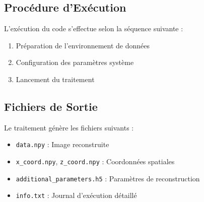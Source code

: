 \documentclass[12pt,a4paper]{article}
\begin{document}
\subsection{Procédure d'Exécution}
L'exécution du code s'effectue selon la séquence suivante :
\begin{enumerate}
    \item Préparation de l'environnement de données
    \item Configuration des paramètres système
    \item Lancement du traitement
\end{enumerate}

\subsection{Fichiers de Sortie}
Le traitement génère les fichiers suivants :
\begin{itemize}
    \item \texttt{data.npy} : Image reconstruite
    \item \texttt{x\_coord.npy}, \texttt{z\_coord.npy} : Coordonnées spatiales
    \item \texttt{additional\_parameters.h5} : Paramètres de reconstruction
    \item \texttt{info.txt} : Journal d'exécution détaillé
\end{itemize}
\end{document}
